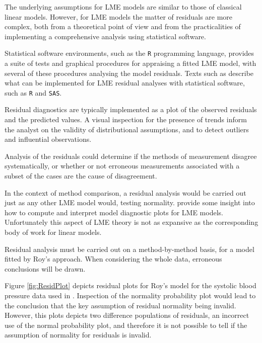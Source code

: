 \documentclass[12pt, a4paper]{report}
\theoremstyle{definition}
\theoremstyle{remark}
\begin{document}
The underlying assumptions for LME models are similar to those of classical linear models. However, for LME models the matter of residuals are more complex, both from a theoretical point of view and from the practicalities of implementing a comprehensive analysis using statistical software.

Statistical software environments, such as the \texttt{R} programming language, provides a suite of tests and graphical procedures for appraising a fitted LME model, with several of these procedures analysing the model residuals. Texts such as \citet{PB,west,Galecki} describe what can be implemented for LME residual analyses with statistical software, such as \texttt{R} and \texttt{SAS}.



Residual diagnostics are typically implemented as a plot of the observed residuals and the predicted values. A visual inspection for the presence of trends inform the analyst on the validity of distributional assumptions, and to detect outliers and influential observations.



Analysis of the residuals could determine if the methods of measurement disagree systematically, or whether or not erroneous measurements associated with a subset of the cases are the cause of disagreement. 

In the context of method comparison, a residual analysis would be carried out just as any other LME model would, testing normality. \citet{PB} provide some insight into how to compute and interpret model diagnostic plots for LME models. Unfortunately this aspect of LME theory is not as expansive as the corresponding body of work for linear models.

Residual analysis must be carried out on a method-by-method basis, for a model fitted by Roy's approach. When considering the whole data, erroneous conclusions will be drawn.

Figure \ref{fig:ResidPlot} depicts residual plots for Roy's model for the systolic blood pressure data used in \citet{BA99}. Inspection of the normality probability plot would lead to the conclusion that the key assumption of residual normality being invalid. However, this plots depicts two difference populations of residuals, an incorrect use of the normal probability plot, and therefore it is not possible to tell if the assumption of normality for residuals is invalid.
\end{document}
